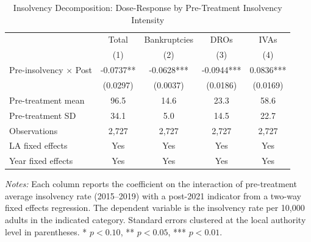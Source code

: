\begin{table}[htbp]
\centering
\caption{Insolvency Decomposition: Dose-Response by Pre-Treatment Insolvency Intensity}
\label{tab:decomposition}
\begin{tabular}{lcccc}
\hline\hline
 & Total & Bankruptcies & DROs & IVAs \\
 & (1) & (2) & (3) & (4) \\
\hline
Pre-insolvency $\times$ Post & -0.0737** & -0.0628*** & -0.0944*** & 0.0836*** \\
 & (0.0297) & (0.0037) & (0.0186) & (0.0169) \\
\addlinespace
Pre-treatment mean & 96.5 & 14.6 & 23.3 & 58.6 \\
Pre-treatment SD & 34.1 & 5.0 & 14.5 & 22.7 \\
Observations & 2,727 & 2,727 & 2,727 & 2,727 \\
LA fixed effects & Yes & Yes & Yes & Yes \\
Year fixed effects & Yes & Yes & Yes & Yes \\
\hline\hline
\end{tabular}
\par\vspace{0.3em}
{\footnotesize \textit{Notes:} Each column reports the coefficient on the interaction of pre-treatment average insolvency rate (2015--2019) with a post-2021 indicator from a two-way fixed effects regression. The dependent variable is the insolvency rate per 10,000 adults in the indicated category. Standard errors clustered at the local authority level in parentheses. * $p<0.10$, ** $p<0.05$, *** $p<0.01$.}
\end{table}

